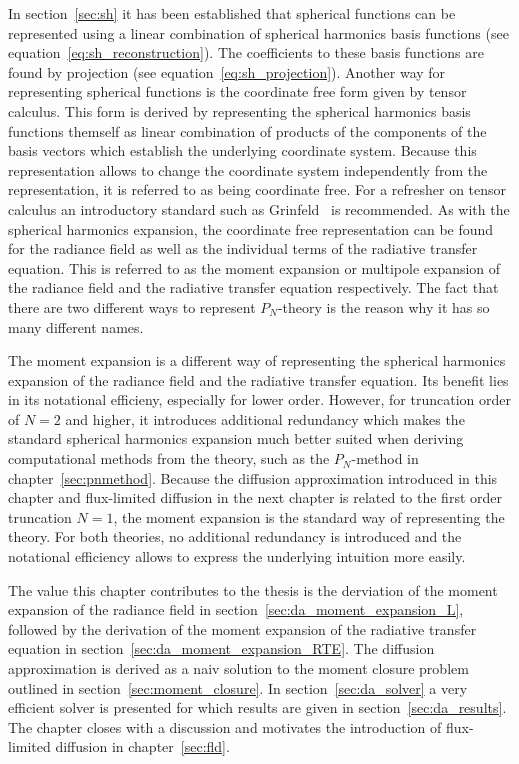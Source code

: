 In section~\ref{sec:sh} it has been established that spherical functions can be represented using a linear combination of spherical harmonics basis functions (see equation~\ref{eq:sh_reconstruction}). The coefficients to these basis functions are found by projection (see equation~\ref{eq:sh_projection}). Another way for representing spherical functions is the coordinate free form given by tensor calculus. This form is derived by representing the spherical harmonics basis functions themself as linear combination of products of the components of the basis vectors which establish the underlying coordinate system. Because this representation allows to change the coordinate system independently from the representation, it is referred to as being coordinate free. For a refresher on tensor calculus an introductory standard such as Grinfeld~\cite{Grinfeld13} is recommended. As with the spherical harmonics expansion, the coordinate free representation can be found for the radiance field as well as the individual terms of the radiative transfer equation. This is referred to as the moment expansion or multipole expansion of the radiance field and the radiative transfer equation respectively. The fact that there are two different ways to represent $P_N$-theory is the reason why it has so many different names.

The moment expansion is a different way of representing the spherical harmonics expansion of the radiance field and the radiative transfer equation. Its benefit lies in its notational efficieny, especially for lower order. However, for truncation order of $N=2$ and higher, it introduces additional redundancy which makes the standard spherical harmonics expansion much better suited when deriving computational methods from the theory, such as the $P_N$-method in chapter~\ref{sec:pnmethod}. Because the diffusion approximation introduced in this chapter and flux-limited diffusion in the next chapter is related to the first order truncation $N=1$, the moment expansion is the standard way of representing the theory. For both theories, no additional redundancy is introduced and the notational efficiency allows to express the underlying intuition more easily.

The value this chapter contributes to the thesis is the derviation of the moment expansion of the radiance field in section~\ref{sec:da_moment_expansion_L}, followed by the derivation of the moment expansion of the radiative transfer equation in section~\ref{sec:da_moment_expansion_RTE}. The diffusion approximation is derived as a naiv solution to the moment closure problem outlined in section~\ref{sec:moment_closure}. In section~\ref{sec:da_solver} a very efficient solver is presented for which results are given in section~\ref{sec:da_results}. The chapter closes with a discussion and motivates the introduction of flux-limited diffusion in chapter~\ref{sec:fld}.










